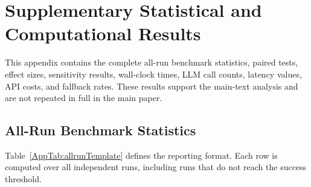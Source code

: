 \documentclass[11pt]{article}
\begin{document}
\begin{table}[!htbp]
	\centering
	\small
	\caption{Event-level VFM records. Values are extracted from the verified event log.\label{AppTab:vfmEvents}}
\end{table}

\FloatBarrier

\section{Supplementary Statistical and Computational Results}
\label{App:SupplementaryResults}

This appendix contains the complete all-run benchmark statistics, paired tests, effect sizes, sensitivity results, wall-clock times, LLM call counts, latency values, API costs, and fallback rates. These results support the main-text analysis and are not repeated in full in the main paper.

\subsection{All-Run Benchmark Statistics}

Table~\ref{AppTab:allrunTemplate} defines the reporting format. Each row is computed over all independent runs, including runs that do not reach the success threshold.
\end{document}
